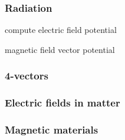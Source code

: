 \documentclass{article}
\begin{document}
\begin{multicols*}{3}
\subsubsection*{Radiation}
compute electric field potential

magnetic field vector potential

\subsubsection*{4-vectors}

\subsubsection*{Electric fields in matter}

\subsubsection*{Magnetic materials}

\end{multicols*}
\end{document}
